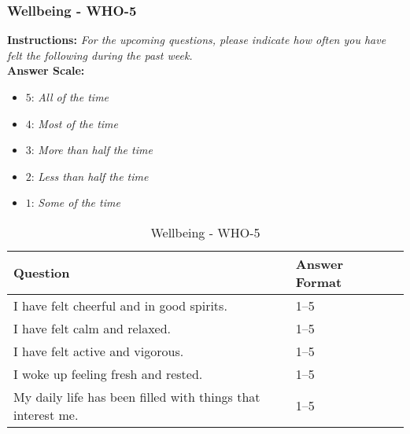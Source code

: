 \subsubsection{Wellbeing - WHO-5}\label{sec:who-5}
\textbf{Instructions:} \emph{For the upcoming questions, please indicate how often you have felt the following during the past week.}
\\
\textbf{Answer Scale:}
\begin{itemize}
    \item $5$: \emph{All of the time}
    \item $4$: \emph{Most of the time}
    \item $3$: \emph{More than half the time}
    \item $2$: \emph{Less than half the time}
    \item $1$: \emph{Some of the time}
\end{itemize}
\begin{table}[H]
    \centering
    \renewcommand{\arraystretch}{1.2}
    \begin{tabularx}{\textwidth}{|l|X|l|}
        \hline
        \textbf{Question} & \textbf{Answer Format} \\ \hline
        I have felt cheerful and in good spirits. & 1--5 \\ \hline
        I have felt calm and relaxed. & 1--5 \\ \hline
        I have felt active and vigorous. & 1--5 \\ \hline
        I woke up feeling fresh and rested. & 1--5 \\ \hline
        My daily life has been filled with things that interest me. & 1--5 \\ \hline
    \end{tabularx}
    \caption{Wellbeing - WHO-5}
    \label{tab:who-5}
\end{table}


\newpage
